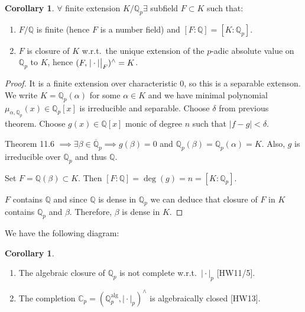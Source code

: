 \documentclass[openany]{amsbook}
\numberwithin{section}{chapter}
\theoremstyle{definition}
\newtheorem{corollary}[theorem]{Corollary}
\begin{document}
\begin{corollary}
    \(\forall \) finite extension \(K / \mathbb{Q}_p \exists\) subfield \(F \subset K\) such that:
    
    \begin{enumerate}[label=\roman*)]
        \item \(F / \mathbb{Q}\) is finite (hence \(F\) is a number field) and \([F:\mathbb{Q}] = [K : \mathbb{Q}_p]\).
        \item \(F\) is closure of \(K\) w.r.t.\ the unique extension of the \(p\)-adic absolute value on \(\mathbb{Q}_p\) to \(K\), hence \((F, \eval{\vert \cdot \vert}_F)^\wedge = K\).  
    \end{enumerate} 
\end{corollary}

\begin{proof}
    It is a finite extension over characteristic \(0\), so this is a separable extenson. We write \(K = \mathbb{Q}_p(\alpha)\) for some \(\alpha \in K\) and we have minimal polynomial \(\mu_{\alpha, \mathbb{Q}_p}(x) \in \mathbb{Q}_p[x]\) is irreducible and separable. Choose \(\delta\) from previous theorem. Choose \(g(x) \in \mathbb{Q}[x]\) monic of degree \(n\) such that \(\vert f-g \vert < \delta\).

    Theorem 11.6 \(\implies \exists \beta \in \overline{\mathbb{Q}}_p \implies g(\beta) = 0\) and \(\mathbb{Q}_p(\beta) = \mathbb{Q}_p(\alpha) = K\). Also, \(g\) is irreducible over \(\mathbb{Q}_p\) and thus \(\mathbb{Q}\).
    
    Set \(F = \mathbb{Q}(\beta) \subset K\). Then \([F:\mathbb{Q}] = \deg(g) = n = [K:\mathbb{Q}_p] \).
    
    \(F\) contains \(\mathbb{Q}\) and since \(\mathbb{Q}\) is dense in \(\mathbb{Q}_p\) we can deduce that closure of \(F\) in \(K\) contains \(\mathbb{Q}_p\) and \(\beta\). Therefore, \(\beta\) is dense in \(K\).
\end{proof}

We have the following diagram:

\begin{center}
\end{center}

\begin{corollary}
    \begin{enumerate}[label=\roman*)]
        \item The algebraic closure of \(\mathbb{Q}_p\) is not complete w.r.t.\ \(\vert \cdot \vert_p\) [HW11/5].
        \item The completion \(\mathbb{C}_p = (\mathbb{Q}_p^{\operatorname{alg}}, \vert \cdot \vert_p)^\wedge\) is algebraically closed [HW13].  
    \end{enumerate} 
\end{corollary}
\end{document}
